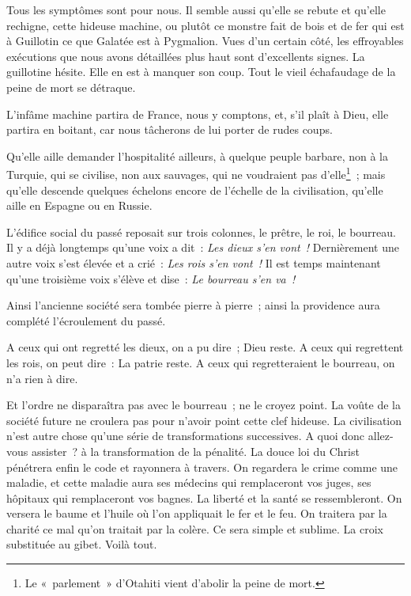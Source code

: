 \documentclass[french,twoside]{book} %
\begin{document}
Tous les symptômes sont pour nous. Il semble aussi qu’elle se rebute et qu’elle rechigne, cette hideuse machine, ou plutôt ce monstre fait de bois et de fer qui est à Guillotin ce que Galatée est à Pygmalion. Vues d’un certain côté, les effroyables exécutions que nous avons détaillées plus haut sont d’excellents signes. La guillotine hésite. Elle en  est à manquer son coup. Tout le vieil échafaudage de la peine de mort se détraque.\par
L’infâme machine partira de France, nous y comptons, et, s’il plaît à Dieu, elle partira en boitant, car nous tâcherons de lui porter de rudes coups.\par
Qu’elle aille demander l’hospitalité ailleurs, à quelque peuple barbare, non à la Turquie, qui se civilise, non aux sauvages, qui ne voudraient pas d’elle\footnote{ \noindent Le « parlement » d’Otahiti vient d’abolir la peine de mort.
 } ; mais qu’elle descende quelques échelons encore de l’échelle de la civilisation, qu’elle aille en Espagne ou en Russie.\par
L’édifice social du passé reposait sur trois colonnes, le prêtre, le roi, le bourreau. Il y a déjà longtemps qu’une voix a dit : \emph{Les dieux s’en vont !} Dernièrement une autre voix s’est élevée et a crié : \emph{Les rois s’en vont !} Il est temps maintenant qu’une troisième voix s’élève et dise : \emph{Le bourreau s’en va !}\par
Ainsi l’ancienne société sera tombée pierre à pierre ; ainsi la providence aura complété l’écroulement du passé.\par
A ceux qui ont regretté les dieux, on a pu dire ; Dieu reste. A ceux qui regrettent les rois, on peut dire : La patrie reste. A ceux qui regretteraient le bourreau, on n’a rien à dire.\par
Et l’ordre ne disparaîtra pas avec le bourreau ; ne le croyez point. La voûte de la société future ne croulera pas pour n’avoir point cette clef hideuse. La civilisation n’est autre chose qu’une série de transformations successives. A quoi donc allez-vous assister ? à la transformation de la pénalité. La douce loi du Christ pénétrera enfin le code et  rayonnera à travers. On regardera le crime comme une maladie, et cette maladie aura ses médecins qui remplaceront vos juges, ses hôpitaux qui remplaceront vos bagnes. La liberté et la santé se ressembleront. On versera le baume et l’huile où l’on appliquait le fer et le feu. On traitera par la charité ce mal qu’on traitait par la colère. Ce sera simple et sublime. La croix substituée au gibet. Voilà tout.\par
\end{document}
